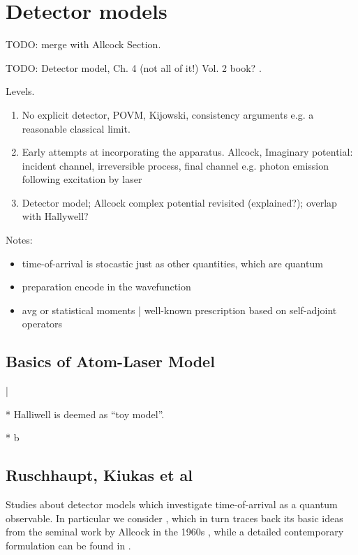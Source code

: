 \section{Detector models}\label{sec:hist:detect}

TODO: merge with Allcock Section.

TODO: Detector model, Ch. 4 (not all of it!) Vol. 2 book? \parencite[Ch. 4]{TQM2}.

Levels.

\begin{enumerate}
  \item No explicit detector, POVM, Kijowski, consistency arguments e.g. a reasonable classical limit.
  \item Early attempts at incorporating the apparatus. Allcock, Imaginary potential: incident channel, irreversible process, final channel e.g. photon emission following excitation by laser
  \item Detector model; Allcock complex potential revisited (explained?); overlap with Hallywell?
\end{enumerate}

Notes:
\begin{itemize}
  \item time-of-arrival is stocastic just as other quantities, which are quantum
  \item preparation encode in the wavefunction
  \item avg or statistical moments | well-known prescription based on self-adjoint operators
\end{itemize}

\subsection{Basics of Atom-Laser Model}

|

* Halliwell is deemed as ``toy model''.

* b

\subsection{Ruschhaupt, Kiukas et al}\label{sec:hist:detect:kiukas}

Studies
about detector models which investigate
time-of-arrival as a quantum observable.
In particular we consider \cite{RuschhauptAbsorption},
which in turn traces back its basic ideas from the seminal work by Allcock
in the 1960s \parencite{Allcock-1, Allcock-2, Allcock-3},
while a detailed contemporary formulation can be found in
\cite[Ch. 4]{TQM2}.

